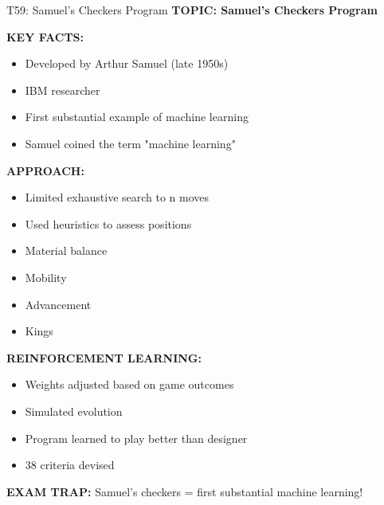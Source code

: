 \documentclass[8pt]{beamer}
\begin{document}
	\begin{frame}{T59: Samuel's Checkers Program}
		\fontsize{6.5}{7.5}\selectfont
		\textbf{TOPIC: Samuel's Checkers Program}
		
		\vspace{0.1cm}
		\textbf{KEY FACTS:}
		\begin{itemize}
			\item Developed by Arthur Samuel (late 1950s)
			\item IBM researcher
			\item First substantial example of machine learning
			\item Samuel coined the term "machine learning"
		\end{itemize}
		
		\vspace{0.1cm}
		\textbf{APPROACH:}
		\begin{itemize}
			\item Limited exhaustive search to n moves
			\item Used heuristics to assess positions
			\item Material balance
			\item Mobility
			\item Advancement
			\item Kings
		\end{itemize}
		
		\vspace{0.1cm}
		\textbf{REINFORCEMENT LEARNING:}
		\begin{itemize}
			\item Weights adjusted based on game outcomes
			\item Simulated evolution
			\item Program learned to play better than designer
			\item 38 criteria devised
		\end{itemize}
		
		\textcolor{myred}{\textbf{EXAM TRAP:}} Samuel's checkers = \textcolor{myblue}{first substantial machine learning}!
	\end{frame}
	
\end{document}
